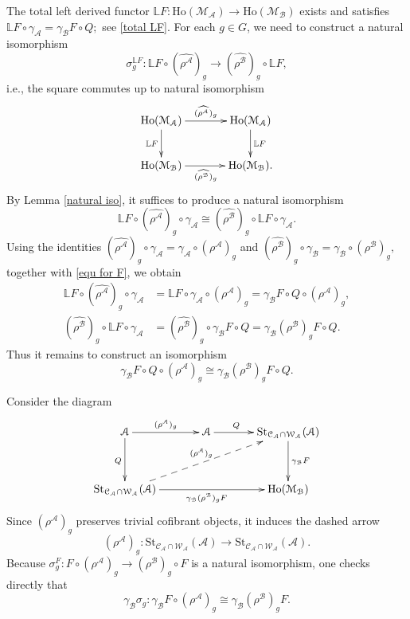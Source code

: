\documentclass[12pt,twoside]{amsart}
\theoremstyle{bfupright head,slanted body}
\theoremstyle{bfupright head,upright body}
\theoremstyle{fixed bf head,slanted body}
\theoremstyle{fixed bf head,upright body}
\theoremstyle{numbered paragraph}
\newenvironment{prf*}[1][Proof]{%
  \begin{proof}[\bf #1]
    \setcounter{equation}{0}
    \renewcommand{\theequation}{\arabic{equation}}}
  {\end{proof}
}
\numberwithin{equation}{res}
\newcommand{\calC}{\mathcal{C}}
\newcommand{\calW}{\mathcal{W}}
\newcommand{\calA}{\mathcal{A}}
\newcommand{\calB}{\mathcal{B}}
\newcommand{\calM}{\mathcal{M}}
\newcommand{\Ho}{\mathrm{Ho}}
\newcommand{\St}{\mathrm{St}}
\begin{document}
\begin{prf*}
The total left derived functor \(\mathbb{L}F:\Ho(\calM_\calA)\to\Ho(\calM_\calB)\) exists and satisfies
\(
\mathbb{L}F\circ\gamma_{\calA}=\gamma_{\calB}F\circ Q;
\)
see \ref{total LF}.
For each \(g\in G\), we need to construct a natural isomorphism
\[
\sigma_g^{\mathbb{L}F}:
\mathbb{L}F\circ(\widehat{\rho^\calA})_g
\longrightarrow
(\widehat{\rho^\calB})_g\circ\mathbb{L}F,
\]
i.e., the square commutes up to natural isomorphism
\[
\xymatrix@C=1.25cm{
   \Ho(\calM_\calA) \ar[d]_{\mathbb{L}F} \ar[r]^{(\widehat{\rho^\calA})_g}
&  \Ho(\calM_\calA) \ar[d]^{\mathbb{L}F} \\
   \Ho(\calM_\calB) \ar[r]_{(\widehat{\rho^\calB})_g}
&  \Ho(\calM_\calB).
}
\]
By Lemma \ref{natural iso}, it suffices to produce a natural isomorphism
\[
\mathbb{L}F\circ(\widehat{\rho^\calA})_g\circ\gamma_{\calA}
\cong
(\widehat{\rho^\calB})_g\circ\mathbb{L}F\circ\gamma_{\calA}.
\]
Using the identities
\(
(\widehat{\rho^\calA})_g\circ\gamma_{\calA}=\gamma_{\calA}\circ(\rho^\calA)_g
\)
and
\((\widehat{\rho^\calB})_g\circ\gamma_{\calB}=\gamma_{\calB}\circ(\rho^\calB)_g,
\)
together with \ref{equ for F}, we obtain
\begin{align*}
\mathbb{L}F\circ(\widehat{\rho^\calA})_g\circ\gamma_{\calA}
&= \mathbb{L}F\circ\gamma_{\calA}\circ(\rho^\calA)_g
   = \gamma_\calB F\circ Q\circ(\rho^\calA)_g, \\
(\widehat{\rho^\calB})_g\circ\mathbb{L}F\circ\gamma_{\calA}
&= (\widehat{\rho^\calB})_g\circ\gamma_\calB F\circ Q
   = \gamma_\calB(\rho^\calB)_g F\circ Q.
\end{align*}
Thus it remains to construct an isomorphism
\[
\gamma_\calB F\circ Q\circ(\rho^\calA)_g
\cong
\gamma_\calB(\rho^\calB)_g F\circ Q.
\]

Consider the diagram
\[
\xymatrix@C=1.25CM@R=1.25CM{
   \calA \ar[d]_{Q} \ar[r]^{(\rho^\calA)_g}
&  \calA \ar[r]^{Q\ \ \ \ \ \ }
&  \St_{\calC_\calA \cap \calW_\calA}(\calA) \ar[d]^{\gamma_\calB F} \\
   \St_{\calC_\calA \cap \calW_\calA}(\calA)
   \ar[rr]_{\gamma_\calB(\rho^\calB)_g F}
   \ar@{-->}[urr]^{(\rho^\calA)_g}
&& \Ho(\calM_\calB)
}
\]
Since \((\rho^\calA)_g\) preserves trivial cofibrant objects, it induces the dashed arrow
\[
(\rho^\calA)_g:\St_{\calC_\calA\cap\calW_\calA}(\calA)
\to
\St_{\calC_\calA\cap\calW_\calA}(\calA).
\]
Because \(\sigma^F_g:F\circ(\rho^\calA)_g\to(\rho^\calB)_g\circ F\) is a natural isomorphism, one checks directly that
\[
\gamma_\calB\sigma_g:
\gamma_\calB F\circ(\rho^\calA)_g
\cong
\gamma_\calB(\rho^\calB)_g F.
\]


\end{prf*}
\end{document}
